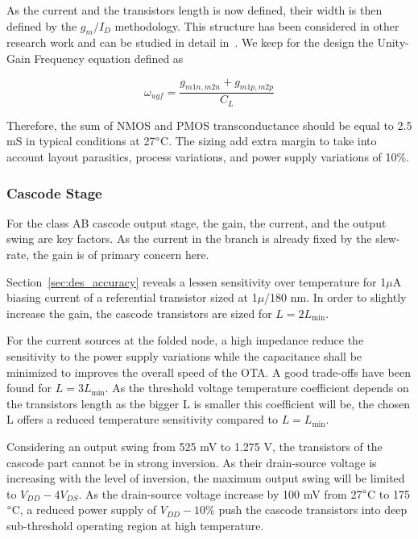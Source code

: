 As the current and the transistors length is now defined, their width is then defined by the \(g_m/I_D \) methodology. This structure has been considered in other research work and can be studied in detail in~\cite{Vallee1994,Lipka2009,Hati2012}. We keep for the design the Unity-Gain Frequency equation defined as

\begin{equation}
\omega_{ugf} = \frac{g_{m1n,m2n} + g_{m1p,m2p}}{C_L}
\end{equation}

Therefore, the sum of NMOS and PMOS transconductance should be equal to 2.5 mS in typical conditions at 27\(\degree \)C. The sizing add extra margin to take into account layout parasitics, process variations, and power supply variations of 10\%.

\subsubsection{Cascode Stage}
For the class AB cascode output stage, the gain, the current, and the output swing are key factors. As the current in the branch is already fixed by the slew-rate, the gain is of primary concern here.

Section~\ref{sec:des_accuracy} reveals a lessen sensitivity over temperature for 1\(\mu \)A biasing current of a referential transistor sized at 1\(\mu \)/180 nm. In order to slightly increase the gain, the cascode transistors are sized for \(L = 2 L_{\min} \).

For the current sources at the folded node, a high impedance reduce the sensitivity to the power supply variations while the capacitance shall be minimized to improves the overall speed of the OTA\@. A good trade-offs have been found for \(L = 3 L_{\min} \). As the threshold voltage temperature coefficient depends on the transistors length as the bigger L is smaller this coefficient will be, the chosen L offers a reduced temperature sensitivity compared to \(L = L_{\min} \).

Considering an output swing from 525 mV to 1.275 V, the transistors of the cascode part cannot be in strong inversion. As their drain-source voltage is increasing with the level of inversion, the maximum output swing will be limited to \(V_{DD} - 4 V_{DS} \). As the drain-source voltage increase by 100 mV from 27\(\degree \)C to 175\(\degree \)C, a reduced power supply of \(V_{DD} - 10\% \) push the cascode transistors into deep sub-threshold operating region at high temperature.

